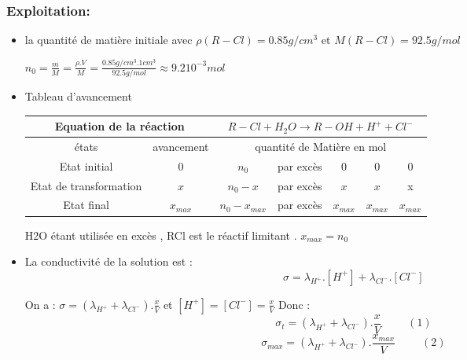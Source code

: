 \documentclass[12pt]{article}
\begin{document}
\subsubsection{Exploitation: }
\begin{itemize}
	\item la quantité de matière initiale avec $\rho(R-Cl) = 0.85g/cm^3$ et $M(R-Cl) = 92.5 g/mol$

	      $n_0 = \frac{m}{M} =\frac{\rho.V}{M} = \frac{0.85g/cm^3 . 1cm^3}{92.5 g/mol} \approx 9.2 10^{-3} mol$
	\item Tableau d'avancement

	      \begin{tabular}{|c|c|c|c|c|c|c|}
		      \hline
		      \multicolumn{2}{|c|}{Equation de la réaction} & \multicolumn{5}{c|}{$ R-Cl + H_2O \rightarrow  R-OH + H^++ Cl^-$}                                                                                                        \\\hline
		      états                                         & avancement                                                        & \multicolumn{5}{|c|}{quantité de Matière en mol}                                                     \\\hline
		      Etat initial                                  & 0                                                                 & $ n_0$                                           & par excès & $ 0$      & $ 0$        & 0           \\\hline
		      Etat de transformation                        & $x$                                                               & $ n_0- x$                                        & par excès & $ x$      & $ x$        & x           \\\hline
		      Etat final                                    & $x_{max}$                                                         & $ n_0-x_{max}$                                   & par excès & $x_{max}$ & $  x_{max}$ & $  x_{max}$ \\\hline
	      \end{tabular}

	      H2O étant utilisée en excès , RCl est le réactif limitant . $x_{max} = n_0$

	\item La conductivité de la solution est : $$\sigma = \lambda_{H^+}.[H^+] + \lambda_{Cl^-}.[Cl^-]$$

	      On a : $\sigma = (\lambda_{H^+} + \lambda_{Cl^-}).\frac{x}{V}$ et $[H^+]= [Cl^-] =\frac{x}{V}$
	      Donc : $$\sigma_t = (\lambda_{H^+} + \lambda_{Cl^-}).\frac{x}{V} \hspace{1cm} (1) $$
	      $$\sigma_{max} = (\lambda_{H^+} + \lambda_{Cl^-}).\frac{x_{max}}{V} \hspace{1cm}  (2)$$


\end{itemize}
\end{document}
